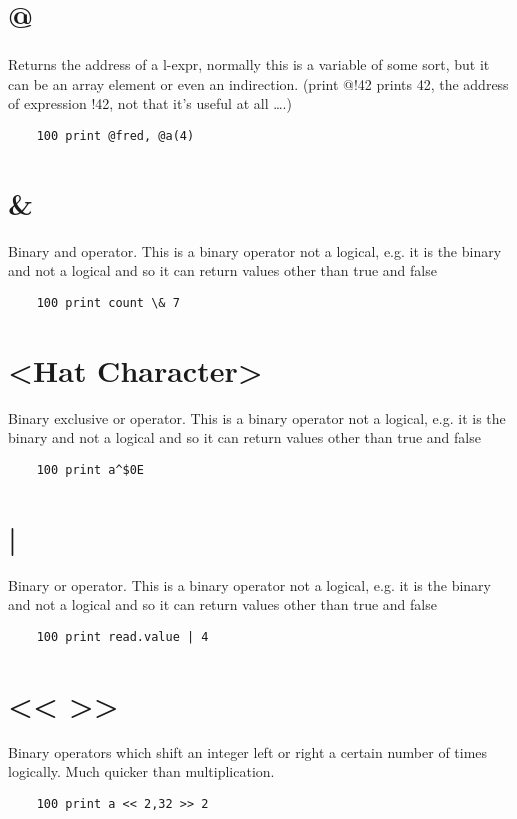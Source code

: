 \section*{@}
Returns the address of a l-expr, normally this is a variable of some sort, but it can be an array element or even an indirection. (print @!42 prints 42, the address of expression !42, not that it’s useful at all ….)
\example{}
\begin{verbatim}
	100 print @fred, @a(4)
\end{verbatim}

\section*{\&}
Binary and operator. This is a binary operator not a logical, e.g. it is the binary and not a logical and so it can return values other than true and false
\example{}
\begin{verbatim}
	100 print count \& 7
\end{verbatim}

\section*{<Hat Character>}
Binary exclusive or operator. This is a binary operator not a logical, e.g. it is the binary and not a logical and so it can return values other than true and false
\example{}
\begin{verbatim}
	100 print a^$0E
\end{verbatim}

\section*{|}
Binary or operator. This is a binary operator not a logical, e.g. it is the binary and not a logical and so it can return values other than true and false
\example{}
\begin{verbatim}
	100 print read.value | 4
\end{verbatim}

\section*{<< >>}
Binary operators which shift an integer left or right a certain number of times logically. Much quicker than multiplication.
\example{}
\begin{verbatim}
	100 print a << 2,32 >> 2
\end{verbatim}

